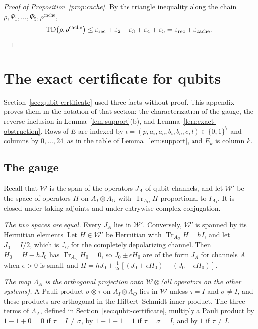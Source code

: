 \documentclass[11pt,letterpaper]{article}
\theoremstyle{definition}\newtheorem{definition}[theorem]{Definition}
\newcommand{\Tr}{\operatorname{Tr}}
\newcommand{\TD}{\operatorname{TD}}
\begin{document}
\begin{proof}[Proof of Proposition~\ref{prop:cache}]
By the triangle inequality along the chain
$\rho,\Psi_1,\dots,\Psi_5,\rho^{\mathrm{cache}}$,
\[
 \TD\bigl(\rho,\rho^{\mathrm{cache}}\bigr)\le
 \varepsilon_{\mathrm{rec}}+\varepsilon_2+\varepsilon_3+\varepsilon_4+\varepsilon_5
 =\varepsilon_{\mathrm{rec}}+\varepsilon_{\mathrm{cache}} . \qedhere
\]
\end{proof}

\section{The exact certificate for qubits}\label{sec:certificate}

Section~\ref{sec:qubit-certificate} used three facts without proof.
This appendix proves them in the notation of that section: the
characterization of the gauge, the reverse
inclusion in Lemma~\ref{lem:support}(b), and
Lemma~\ref{lem:exact-obstruction}. Rows of $E$ are indexed by
$\iota=(p,a_i,a_o,b_i,b_o,c,t)\in\{0,1\}^7$ and columns by
$0,\dots,24$, as in the table of Lemma~\ref{lem:support}, and $E_k$ is
column $k$.

\subsection{The gauge}\label{sec:gauge-proof}

Recall that $\mathcal W$ is the span of the operators $J_A$ of qubit
channels, and let $\mathcal W'$ be the space of operators $H$ on
$A_I\otimes A_O$ with $\Tr_{A_O}H$ proportional to $I_{A_I}$. It is
closed under taking adjoints and under entrywise complex conjugation.

\emph{The two spaces are equal.} Every $J_A$ lies in $\mathcal W'$.
Conversely, $\mathcal W'$ is spanned by its Hermitian elements. Let
$H\in\mathcal W'$ be Hermitian with
$\Tr_{A_O}H=hI$, and let $J_0=I/2$, which is $J_\Omega$ for the
completely depolarizing channel. Then $H_0=H-hJ_0$ has
$\Tr_{A_O}H_0=0$, so $J_0\pm\epsilon H_0$ are of the form $J_A$ for
channels $A$ when $\epsilon>0$ is small, and
$H=hJ_0+\frac1{2\epsilon}[(J_0+\epsilon H_0)-(J_0-\epsilon H_0)]$.

\emph{The map $\Lambda_A$ is the orthogonal projection onto
$\mathcal W\otimes{}$\textup{(}all operators on the other
systems\textup{)}.} A Pauli product $\sigma\otimes\tau$ on
$A_I\otimes A_O$ lies in $\mathcal W$ unless $\tau=I$ and
$\sigma\neq I$, and these products are orthogonal in the
Hilbert--Schmidt inner product. The three terms of $\Lambda_A$,
defined in Section~\ref{sec:qubit-certificate},
multiply a Pauli product by $1-1+0=0$ if $\tau=I\neq\sigma$, by
$1-1+1=1$ if $\tau=\sigma=I$, and by $1$ if $\tau\neq I$.
\end{document}
